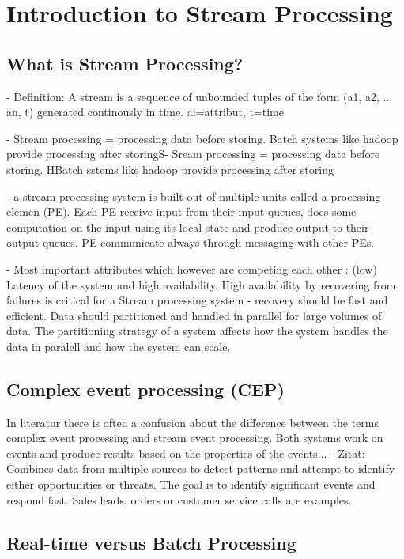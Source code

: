 \chapter{Introduction to Stream Processing}

\section{What is Stream Processing?}
- Definition: A stream is a sequence of unbounded tuples of the form (a1, a2,
... an, t) generated continously in time. ai=attribut, t=time

- Stream processing = processing data before storing. Batch systems like hadoop
provide processing after storingS- Sream processing = processing data before
storing. HBatch sstems like hadoop provide processing after storing  

- a stream processing system is built out of multiple units called a processing
elemen (PE). Each PE receive input from their input queues, does some
computation on the input using its local state and produce output to their
output queues. PE communicate always through messaging with other PEs.

- Most important attributes which however are competing each other : (low)
Latency of the system and high availability. High availability by recovering
from failures is critical for a Stream processing system - recovery should be
fast and efficient. Data should partitioned and handled in parallel for large
volumes of data. The partitioning strategy of a system  affects how the system
handles the data in paralell and how the system can scale. 

\section{Complex event processing (CEP)}
In literatur there is often a confusion about the difference between the terms
complex event processing and stream event processing. Both systems work on
events and produce results based on the properties of the events... 
- Zitat: Combines data from multiple sources  to detect patterns and attempt to
identify either opportunities or threats. The goal is to identify significant
events and respond fast. Sales leads, orders or customer service calls are
examples.\\


\section{Real-time versus Batch Processing}

